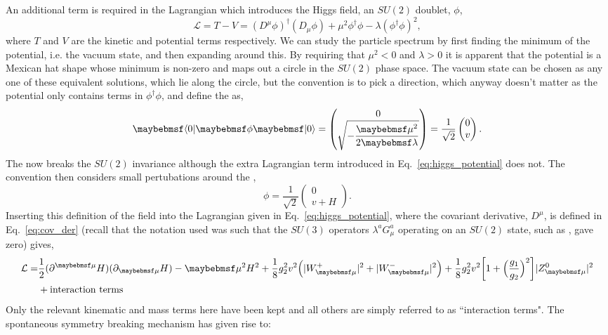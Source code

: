 An additional term is required in the \SM Lagrangian which introduces the Higgs field, an $SU(2)$ doublet, $\phi$,
\begin{equation}
  \mathcal{L} = T - V = (D^{\mu}\phi)^{\dagger}(D_{\mu}\phi) + \mu^{2}\phi^{\dagger}\phi - \lambda(\phi^{\dagger}\phi)^{2},
  \label{eq:higgs_potential}
\end{equation}
where $T$ and $V$ are the kinetic and potential terms respectively. We can study the particle spectrum by first finding the minimum of the potential, i.e. the vacuum state, and then expanding around this. By requiring that $\mu^{2}<0$ and $\lambda>0$ it is apparent that the potential is a Mexican hat shape whose minimum is non-zero and maps out a circle in the $SU(2)$ phase space. The vacuum state can be chosen as any one of these equivalent solutions, which lie along the circle, but the convention is to pick a direction, which anyway doesn't matter as the potential only contains terms in $\phi^{\dagger}\phi$, and define the \VEV as,
\begin{equation}
  \bra{0}\phi\ket{0} = \begin{pmatrix} 0 \\ \sqrt{-\dfrac{\mu^{2}}{2\lambda}} \end{pmatrix} = \frac{1}{\sqrt{2}} \begin{pmatrix} 0 \\ v \end{pmatrix}.
\end{equation}
The \VEV now breaks the $SU(2)$ invariance although the extra Lagrangian term introduced in Eq.~\ref{eq:higgs_potential} does not. The convention then considers small pertubations around the \VEV,
\begin{equation}
  \phi = \dfrac{1}{\sqrt{2}}\begin{pmatrix} 0 \\ v+H \end{pmatrix}.
\end{equation}
Inserting this definition of the field \phi into the Lagrangian given in Eq.~\ref{eq:higgs_potential}, where the covariant derivative, $D^{\mu}$, is defined in Eq.~\ref{eq:cov_der} (recall that the notation used was such that the $SU(3)$ operators $\lambda^{a}G^{a}_{\mu}$ operating on an $SU(2)$ state, such as \phi, gave zero) gives,
\begin{align}
  \mathcal{L} = & \frac{1}{2}(\partial^{\mu}H)(\partial_{\mu}H) - \mu^{2}H^{2} + \frac{1}{8}g_{2}^{2}v^{2}\Bigl(|W_{\mu}^{+}|^{2}+|W_{\mu}^{-}|^{2}\Bigr) +\frac{1}{8}g_{2}^{2}v^{2}\biggl[1+\Bigl(\frac{g_{1}}{g_{2}}\Bigr)^{2}\biggr]|Z^{0}_{\mu}|^{2} \nonumber\\ 
  & + \mbox{interaction terms} 
\end{align}
Only the relevant kinematic and mass terms here have been kept and all others are simply referred to as ``interaction terms". The spontaneous symmetry breaking mechanism has given rise to:

